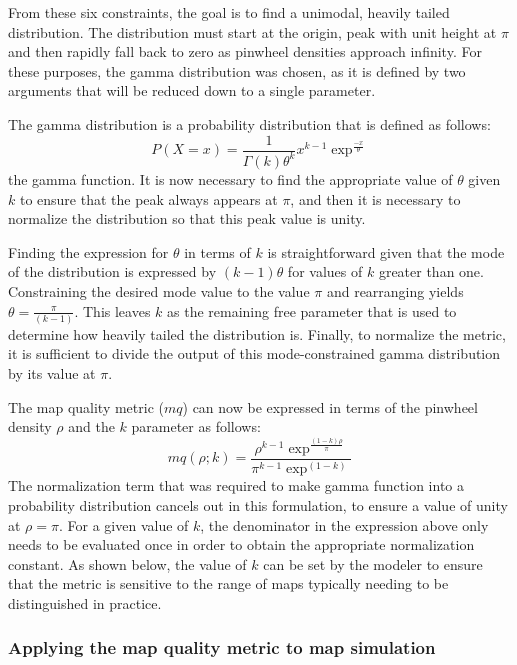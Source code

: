 \documentclass[phd,ianc,twoside]{infthesis}
\begin{document}
From these six constraints, the goal is to find a unimodal,
heavily tailed distribution. The distribution must start at the origin,
peak with unit height at $\pi$ and then rapidly fall back to zero as
pinwheel densities approach infinity. For these purposes, the gamma
distribution was chosen, as it is defined by two arguments that will be
reduced down to a single parameter.

The gamma distribution is a probability distribution that is defined as
follows:
\begin{equation}
P(X=x) = \frac{1}{\Gamma(k) \theta^k} x^{k-1}\exp^\frac{-x}{\theta}
\end{equation}
the gamma function.  It is now necessary to find the appropriate value
of $\theta$ given $k$ to ensure that the peak always appears at $\pi$,
and then it is necessary to normalize the distribution so that this peak
value is unity.

Finding the expression for $\theta$ in terms of $k$ is straightforward
given that the mode of the distribution is expressed by $(k-1)\theta$
for values of $k$ greater than one. Constraining the desired mode value
to the value $\pi$ and rearranging yields
$\theta=\frac{\pi}{(k-1)}$. This leaves $k$ as the remaining free
parameter that is used to determine how heavily tailed the distribution
is. Finally, to normalize the metric, it is sufficient to divide the
output of this mode-constrained gamma distribution by its value at
$\pi$.

The map quality metric ($mq$) can now be expressed in terms of the
pinwheel density $\rho$ and the $k$ parameter as follows:
\begin{equation}
mq(\rho; k) =  \frac{\rho^{k-1}\exp^\frac{(1-k)\rho}{\pi}}{\pi^{k-1}\exp^{(1-k)}}
\end{equation}
The normalization term that was required to make gamma function into a
probability distribution cancels out in this formulation, to ensure a
value of unity at $\rho=\pi$. For a given
value of $k$, the denominator in the expression above only needs to be
evaluated once in order to obtain the appropriate normalization
constant. As shown below, the value of $k$ can be set by the modeler
to ensure that the metric is sensitive to the range of maps typically
needing to be distinguished in practice.

\subsubsection*{Applying the map quality metric to map simulation}
\label{section:map_metric_in_simulations}
\end{document}
